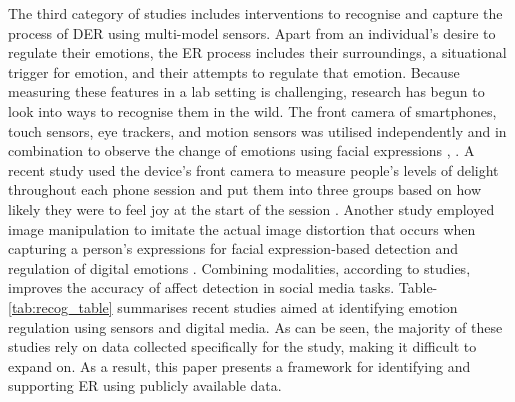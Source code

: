 \documentclass[acmtog]{acmart}
\begin{document}
The third category of studies includes interventions to recognise and capture the process of DER using multi-model sensors. Apart from an individual's desire to regulate their emotions, the ER process includes their surroundings, a situational trigger for emotion, and their attempts to regulate that emotion. Because measuring these features in a lab setting is challenging, research has begun to look into ways to recognise them in the wild. The front camera of smartphones, touch sensors, eye trackers, and motion sensors was utilised independently and in combination to observe the change of emotions using facial expressions \cite{yang2021behavioral}, \cite{ruensuk2020you}. A recent study used the device's front camera to measure people's levels of delight throughout each phone session and put them into three groups based on how likely they were to feel joy at the start of the session \cite{tag2022emotion}. Another study employed image manipulation to imitate the actual image distortion that occurs when capturing a person's expressions for facial expression-based detection and regulation of digital emotions \cite{yang2021benchmarking}. Combining modalities, according to studies, improves the accuracy of affect detection in social media tasks. Table-\ref{tab:recog_table} summarises recent studies aimed at identifying emotion regulation using sensors and digital media. As can be seen, the majority of these studies rely on data collected specifically for the study, making it difficult to expand on. As a result, this paper presents a framework for identifying and supporting ER using publicly available data.
\end{document}
